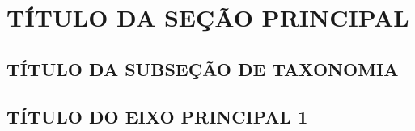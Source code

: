 \section{TÍTULO DA SEÇÃO PRINCIPAL}

\subsection{TÍTULO DA SUBSEÇÃO DE TAXONOMIA}
%
%


\subsection{TÍTULO DO EIXO PRINCIPAL 1}
%
%
% 


